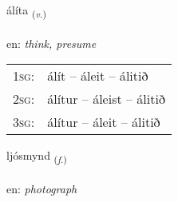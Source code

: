 \documentclass[frontgrid, backgrid]{flacards}\usepackage[]{graphicx}\usepackage[]{color}
\begin{document}
\renewcommand{\flhead}{\vskip5pt \fboxsep=0pt {\small\bfseries\footnotesize Sagnorð | Verb}}
\renewcommand{\fcfoot}{\vskip5pt \fboxsep=0pt \hspace{2pt}{\small\bfseries\footnotesize 2K}}

\renewcommand{\blhead}{\vskip5pt {\small\bfseries\footnotesize Sagnorð | Verb }}
\renewcommand{\bcfoot}{\vskip5pt \hspace{2pt}{\small\bfseries\footnotesize 2K}}


{álíta \small{\textsubscript{(\textit{v.})}} \\[1ex] %
\textphonetic{[auːlita]} \\
en: \emph{think, presume} \\  [2ex]
\renewcommand*{\arraystretch}{0.8}
\begin{tabular}{p{1cm}l}
\textsc{1sg}: & álít -- áleit -- álitið \\ 
\textsc{2sg}: & álítur -- áleist -- álitið \\ 
\textsc{3sg}: & álítur -- áleit -- álitið \\ 
\end{tabular}
}

\renewcommand{\flhead}{\vskip5pt \fboxsep=0pt {\small\bfseries\footnotesize Nafnorð | Noun}}
\renewcommand{\fcfoot}{\vskip5pt \fboxsep=0pt \hspace{2pt}{\small\bfseries\footnotesize 2K}}

\renewcommand{\blhead}{\vskip5pt {\small\bfseries\footnotesize Nafnorð | Noun }}
\renewcommand{\bcfoot}{\vskip5pt \hspace{2pt}{\small\bfseries\footnotesize 2K}}


{ljósmynd \small{\textsubscript{(\textit{f.})}} \\[1ex] %
\textphonetic{[ljousmɪnt]} \\
en: \emph{photograph} \\  [2ex]
\renewcommand*{\arraystretch}{0.8}
}
\end{document}
